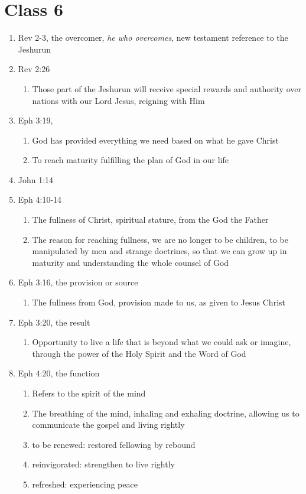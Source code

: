 \documentclass[11pt]{article}
\begin{document}
\section{Class 6}
\begin{enumerate}
	\item Rev 2-3, the overcomer, \emph{he who overcomes}, new testament reference to the Jeshurun
	\item Rev 2:26
	\begin{enumerate}
		\item Those part of the Jeshurun will receive special rewards and authority over nations with our Lord Jesus, reigning with Him
	\end{enumerate}
	\item Eph 3:19,
	\begin{enumerate}
		\item God has provided everything we need based on what he gave Christ
		\item To reach maturity fulfilling the plan of God in our life 
	\end{enumerate}
	\item John 1:14
	\item Eph 4:10-14
	\begin{enumerate}
		\item The fullness of Christ, spiritual stature, from the God the Father
		\item The reason for reaching fullness, we are no longer to be children, to be manipulated by men and strange doctrines, so that we can grow up in maturity and understanding the whole counsel of God
	\end{enumerate}
	\item Eph 3:16, the provision or source
	\begin{enumerate}
		\item The fullness from God, provision made to us, as given to Jesus Christ
	\end{enumerate}
	\item Eph 3:20, the result
	\begin{enumerate}
		\item Opportunity to live a life that is beyond what we could ask or imagine, through the power of the Holy Spirit and the Word of God
	\end{enumerate}
	\item Eph 4:20, the function
	\begin{enumerate}
		\item Refers to the spirit of the mind
		\item The breathing of the mind, inhaling and exhaling doctrine, allowing us to communicate the gospel and living rightly
		\item to be renewed: restored fellowing by rebound 
		\item reinvigorated: strengthen to live rightly
		\item refreshed: experiencing peace 
	\end{enumerate}


\end{enumerate}
\end{document}
